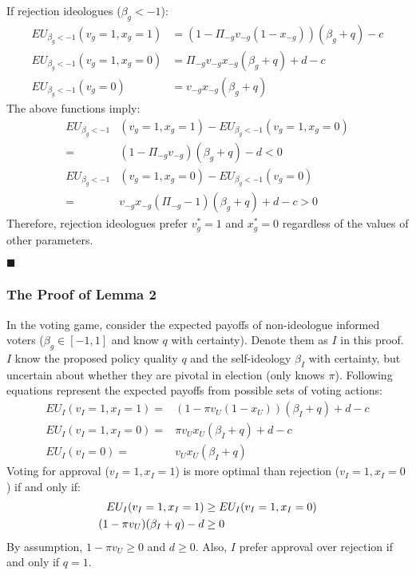 \par If rejection ideologues ($\beta_g<-1$):
\begin{align*}
EU_{\beta_g<-1}(v_g=1, x_g=1) &= (1-\Pi_{-g} v_{-g} (1- x_{-g}))(\beta_g + q)  - c \\
EU_{\beta_g<-1}(v_g=1, x_g=0) &= \Pi_{-g} v_{-g} x_{-g} (\beta_g + q) + d - c \\
EU_{\beta_g<-1}(v_g=0) &= v_{-g} x_{-g} (\beta_g + q)
\end{align*} 
\noindent The above functions imply:
\begin{align*}
EU_{\beta_g<-1}&(v_g=1, x_g=1) - EU_{\beta_g<-1}(v_g=1, x_g=0) \\
=& (1- \Pi_{-g} v_{-g})(\beta_g + q) - d < 0 \\
EU_{\beta_g<-1}&(v_g=1, x_g=0) - EU_{\beta_g<-1}(v_g=0) \\
=& v_{-g} x_{-g} (\Pi_{-g}-1) (\beta_g + q) + d -c  > 0
\end{align*}
\noindent Therefore, rejection ideologues prefer $v^*_g=1$ and $x^*_g=0$ regardless of the values of other parameters.

\hfill $\blacksquare$

\subsubsection{The Proof of Lemma 2}

\par In the voting game, consider the expected payoffs of non-ideologue informed voters ($\beta_g \in [-1,1]$ and know $q$ with certainty). Denote them as $I$ in this proof. $I$   
know the proposed policy quality $q$ and the self-ideology $\beta_I$ with certainty, but uncertain about whether they are pivotal in election (only knows $\pi$). Following equations represent the expected payoffs from possible sets of voting actions:
\begin{align*}
EU_I(v_I=1,x_I=1) = & (1-\pi v_U (1-x_U) ) (\beta_I + q) + d - c \\
EU_I(v_I=1,x_I=0) = &\pi v_U x_U (\beta_I + q) + d - c \\
EU_I(v_I=0) = &v_U  x_U (\beta_I + q)   
\end{align*}
\noindent Voting for approval ($v_I=1,x_I=1$) is more optimal than rejection ($v_I=1,x_I=0$) if and only if:
\begin{align*}
EU_I(v_I=1,x_I=1) &\geq EU_I(v_I=1,x_I=0)  \notag \\
(1 -\pi v_U ) (\beta_I + q) - d &\geq 0 
\end{align*}
\noindent By assumption, $1-\pi v_U \geq 0$ and $d \geq 0$. Also, $I$ prefer approval over rejection if and only if $q=1$.

